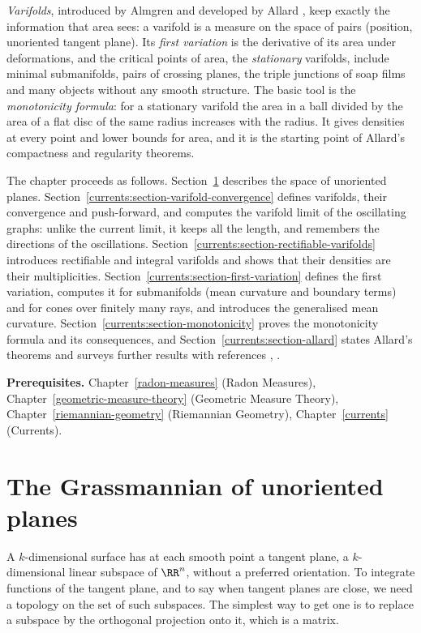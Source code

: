 \emph{Varifolds}, introduced by Almgren and developed by Allard \cite{allard-1972}, keep exactly the information that area sees: a varifold is a measure on the space of pairs (position, unoriented
tangent plane). Its \emph{first variation} is the derivative of its area under deformations, and the critical points of area, the \emph{stationary} varifolds, include minimal submanifolds, pairs of
crossing planes, the triple junctions of soap films and many objects without any smooth structure. The basic tool is the \emph{monotonicity formula}: for a stationary varifold the area in a ball
divided by the area of a flat disc of the same radius increases with the radius. It gives densities at every point and lower bounds for area, and it is the starting point of Allard's compactness and
regularity theorems.

The chapter proceeds as follows. Section~\ref{currents:section-grassmannian} describes the space of unoriented planes. Section~\ref{currents:section-varifold-convergence} defines varifolds, their convergence and
push-forward, and computes the varifold limit of the oscillating graphs: unlike the current limit, it keeps all the length, and remembers the directions of the oscillations.
Section~\ref{currents:section-rectifiable-varifolds} introduces rectifiable and integral varifolds and shows that their densities are their multiplicities. Section~\ref{currents:section-first-variation} defines
the first variation, computes it for submanifolds (mean curvature and boundary terms) and for cones over finitely many rays, and introduces the generalised mean curvature.
Section~\ref{currents:section-monotonicity} proves the monotonicity formula and its consequences, and Section~\ref{currents:section-allard} states Allard's theorems and surveys further results with
references \cite{allard-1972}, \cite{simon-gmt}.

\noindent\textbf{Prerequisites.} Chapter~\ref{radon-measures} (Radon Measures), Chapter~\ref{geometric-measure-theory} (Geometric Measure Theory), Chapter~\ref{riemannian-geometry} (Riemannian Geometry),
Chapter~\ref{currents} (Currents).

\section{The Grassmannian of unoriented planes}\label{currents:section-grassmannian}

A $k$-dimensional surface has at each smooth point a tangent plane, a $k$-dimensional linear subspace of $\RR^n$, without a preferred orientation. To integrate functions of the tangent plane, and to say
when tangent planes are close, we need a topology on the set of such subspaces. The simplest way to get one is to replace a subspace by the orthogonal projection onto it, which is a matrix.

